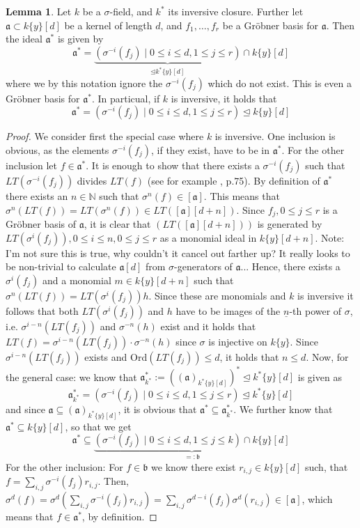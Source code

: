 \documentclass{article}
\def\N{\mathbb{N}}
\def\a{\mathfrak{a}}
\def\b{\mathfrak{b}}
\def\s{\sigma}
\def\n{\underline{n}}
\newenvironment{bew}{\begin{proof}[Proof]}{\end{proof}}
\theoremstyle{definition}
\newtheorem{lem}[Satz]{Lemma}
\begin{document}
\begin{lem}\label{lemgroebner}
Let $k$ be a $\s$-field, and $k^*$ its inversive closure. Further let $\a \subset k\{y\}[d]$ be a kernel of length $d$, and $f_1, \ldots, f_r$ be a Gröbner basis for $\a$. 
Then the ideal $\a^*$ is given by 
\[ \a^* = \underbrace{(\s^{-i}(f_j) \mid 0 \leq i \leq d, 1 \leq j \leq r)}_{\unlhd k^*\{y\}[d]} \cap k\{y\}[d] \]
where we by this notation ignore the $\s^{-i}(f_j)$ which do not exist. This is even a Gröbner basis for $\a^*$. %
In particual, if $k$ is inversive, it holds that
\[ \a^* = (\s^{-i}(f_j) \mid 0 \leq i \leq d, 1 \leq j \leq r) \unlhd k\{y\}[d] \]
\begin{bew}
We consider first the special case where $k$ is inversive. One inclusion is obvious, as the elements $\s^{-i}(f_j)$, if they exist, have to be in $\a^*$. For the other inclusion let $f \in \a^*$.
It is enough to show that there exists a $\s^{-i}(f_j)$ such that $LT(\s^{-i}(f_j))$ divides $LT(f)$ (see for example \cite{cox}, p.75). 
By definition of $\a^*$ there exists an $n \in \N$ such that $\s^n(f) \in [\a]$. This means that $\s^n(LT(f)) = LT(\s^n(f)) \in LT([\a][d+n])$. 
Since $f_j, 0 \leq j \leq r$ is a Gröbner basis of $\a$, it is clear that $(LT([\a][d+n]))$ is generated by $LT(\s^i(f_j)), 0 \leq i \leq n, 0 \leq j \leq r$ as a monomial ideal in $k\{y\}[d+n]$.
Note: I'm not sure this is true, why couldn't it cancel out farther up? It really looks to be non-trivial to calculate $\a[d]$ from $\s$-generators of $\a$...
Hence, there exists a $\s^i(f_j)$ and a monomial $m \in k\{y\}[d+n]$ such that $\s^n(LT(f)) = LT(\s^i(f_j)) h$. Since these are monomials and $k$ is inversive it follows that both $LT(\s^i(f_j))$
and $h$ have to be images of the $\n$-th power of $\s$, i.e. $\s^{i-n}(LT(f_j))$ and $\s^{-n}(h)$ exist and it holds that $LT(f) = \s^{i-n}(LT(f_j)) \cdot \s^{-n}(h)$ since $\s$ is injective on $k\{y\}$.
Since $\s^{i-n}(LT(f_j))$ exists and Ord$(LT(f_j)) \leq d$, it holds that $n \leq d$.
Now, for the general case: we know that $\a^*_{k^*} := ((\a)_{k^*\{y\}[d]})^* \unlhd k^*\{y\}[d]$ is given as
\[ \a^*_{k^*} = (\s^{-i}(f_j) \mid 0 \leq i \leq d, 1 \leq j \leq r) \unlhd k^*\{y\}[d] \]
and since $\a \subseteq (\a)_{k^*\{y\}[d]}$, it is obvious that $\a^* \subseteq \a^*_{k^*}$.
We further know that $\a^* \subseteq k\{y\}[d]$, so that we get 
\[ \a^* \subseteq \underbrace{(\s^{-i}(f_j) \mid 0 \leq i \leq d, 1 \leq j \leq k) \cap k\{y\}[d]}_{=:\b} \]
For the other inclusion: For $f \in \b$ we know there exist $r_{i,j} \in k\{y\}[d]$ such,
that $f = \sum_{i,j} \s^{-i}(f_j)r_{i,j}$. Then, $\s^d(f) = \s^d(\sum_{i,j} \s^{-i}(f_j)r_{i,j}) = \sum_{i,j}\s^{d-i}(f_j)\s^d(r_{i,j}) \in [\a]$,
which means that $f \in \a^*$, by definition.
\end{bew}
\end{lem}
\end{document}
